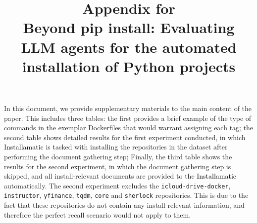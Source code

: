 \documentclass[conference]{IEEEtran}
\newcommand{\name}{\textcolor{black}{Installamatic}\xspace}
\begin{document}
\title{Appendix for \\Beyond pip install: Evaluating LLM agents for the automated installation of Python projects}

\onecolumn
\maketitle
    In this document, we provide supplementary materials to the main content of the paper. This includes three tables:
    the first provides a brief example of the type of commands in the exemplar Dockerfiles that would warrant assigning each tag;
    the second table shows detailed results for the first experiment conducted,
    in which \name is tasked with installing the repositories in the dataset after performing the document gathering step;
    Finally, the third table shows the results for the second experiment, in which the document gathering step is skipped,
    and all install-relevant documents are provided to the \name automatically.
    The second experiment excludes the \texttt{icloud-drive-docker}, \texttt{instructor}, \texttt{yfinance}, \texttt{tqdm}, \texttt{core} and \texttt{sherlock} repositories.
    This is due to the fact that these repositories do not contain any install-relevant information, and therefore the perfect recall scenario would not apply to them.
\end{document}
